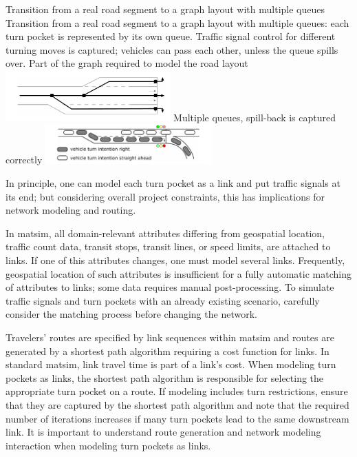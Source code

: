 \createfigure%
{Transition from a real road segment to a graph layout with multiple queues}%
{Transition from a real road segment to a graph layout with multiple queues: each turn pocket is represented by its own queue. Traffic signal control for different turning moves is captured; vehicles can pass each other, unless the queue spills over. }
{\label{fig:lanes_representation}}%
{%
  \createsubfigure%
	{Part of the graph required to model the road layout}
	{\includegraphics[width=0.475\textwidth]{extending/figures/signalslanes/link_lanes_layout}}
	{\label{fig:model_link_layout}}
  \createsubfigure%
	{Multiple queues, spill-back is captured correctly}%
	{\includegraphics[width=0.48\textwidth]{extending/figures/signalslanes/multiple_queue_model_inkscape.pdf}}%
	{\label{fig:lanes_representation_multiple_queue}}%
}%
{\citet{GretherNeumannNagel2012SignalsQueueModelABMTrans}}

In principle, one can model each turn pocket as a link and put traffic signals at its end; 
but considering overall project constraints, this has implications for network modeling and routing. 

In \gls{matsim}, all domain-relevant attributes differing from geospatial location, \eg traffic count data, transit stops, transit lines, or speed limits, are attached to links. 
If one of this attributes changes, one must model several links. 
Frequently, geospatial location of such attributes is insufficient for a fully automatic matching of attributes to links; 
some data requires manual post-processing. 
To simulate traffic signals and turn pockets with an already existing scenario, carefully consider the matching process before changing the network.  

Travelers' routes are specified by link sequences within \gls{matsim} and 
routes are generated by a shortest path algorithm requiring a cost function for links. 
In standard \gls{matsim}, link travel time is part of a link's cost.
When modeling turn pockets as links, the shortest path algorithm is responsible for selecting the appropriate turn pocket on a route.
If modeling includes turn restrictions, ensure that they are captured by the shortest path algorithm and note that 
the required number of iterations increases if many turn pockets lead to the same downstream link. 
It is important to understand route generation and network modeling interaction when modeling turn pockets as links. 

